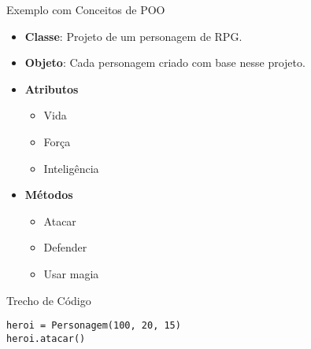 \begin{frame}[fragile]{Exemplo com Conceitos de POO}

    \begin{itemize}
        \item \textbf{Classe}:
              Projeto de um personagem de RPG.
        \item \textbf{Objeto}:
              Cada personagem criado com base nesse projeto.
    \end{itemize}

    \begin{itemize}
        \item \textbf{Atributos}
              \begin{itemize}
                  \item Vida
                  \item Força
                  \item Inteligência
              \end{itemize}
        \item \textbf{Métodos}
              \begin{itemize}
                  \item Atacar
                  \item Defender
                  \item Usar magia
              \end{itemize}

    \end{itemize}

    \begin{exampleblock}{Trecho de Código}
        \begin{verbatim}
heroi = Personagem(100, 20, 15)
heroi.atacar()
\end{verbatim}
    \end{exampleblock}

\end{frame}



